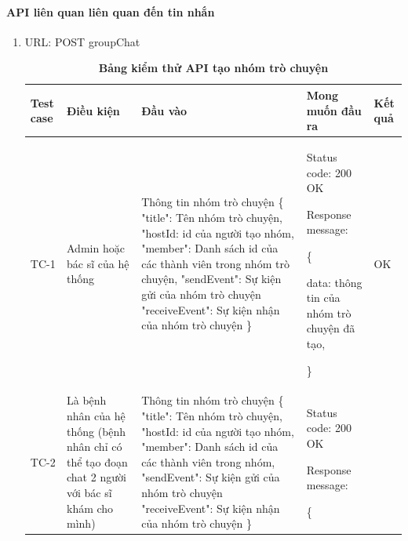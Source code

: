 \paragraph{API liên quan liên quan đến tin nhắn}
\mbox{}
\begin{enumerate}
	\item URL: POST groupChat
	      \begin{xltabular}{\textwidth}{
		      | >{\raggedright\arraybackslash}p{1cm}
		      | >{\raggedright\arraybackslash}p{2.5cm}
		      | >{\raggedright\arraybackslash}X
		      | >{\raggedright\arraybackslash}X
		      | >{\raggedright\arraybackslash}p{1cm}|
		      }
		      \caption{\bfseries \fontsize{12pt}{0pt}\selectfont Bảng kiểm thử API tạo nhóm trò chuyện}
		      \\
		      \hline
		      \bfseries Test case    &\bfseries Điều kiện   &\bfseries Đầu vào
		      &\bfseries Mong muốn đầu ra &\bfseries Kết quả\\ \hline


		      TC-1
		      & Admin hoặc bác sĩ của hệ thống
		      & Thông tin nhóm trò chuyện
		      \{
		      "title": Tên nhóm trò chuyện,
		      "hostId: id của người tạo nhóm,
		      "member": Danh sách id của các thành viên trong nhóm trò chuyện,
		      "sendEvent": Sự kiện gửi của nhóm trò chuyện
		      "receiveEvent": Sự kiện nhận của nhóm trò chuyện
		      \}
		      &

		      Status code: 200 OK

		      Response message:

		      \{

		      data: thông tin của nhóm trò chuyện đã tạo,

		      \}

		      & OK

		      \\ \hline

		      TC-2
		      & Là bệnh nhân của hệ thống (bệnh nhân chỉ có thể tạo đoạn chat 2 người với bác sĩ khám cho mình)
		      & Thông tin nhóm trò chuyện
		      \{
		      "title": Tên nhóm trò chuyện,
		      "hostId: id của người tạo nhóm,
		      "member": Danh sách id của các thành viên trong nhóm,
		      "sendEvent": Sự kiện gửi của nhóm trò chuyện
		      "receiveEvent": Sự kiện nhận của nhóm trò chuyện
		      \}
		      &

		      Status code: 200 OK

		      Response message:

		      \{


\end{xltabular}
\end{enumerate}
